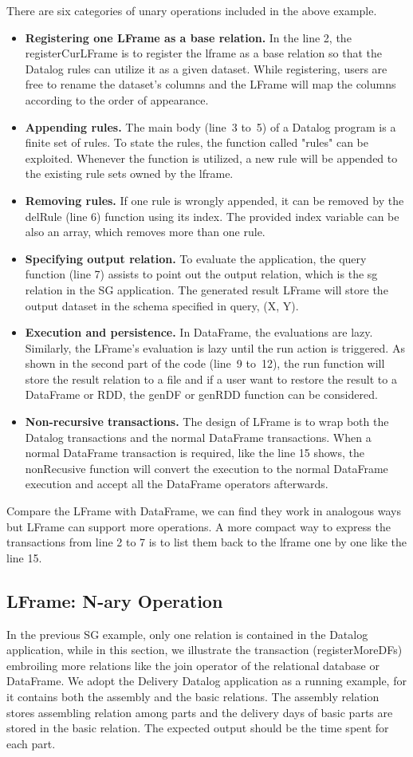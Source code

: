 There are six categories of unary operations included in the above example. 
\begin{itemize}
	\item \textbf{Registering one LFrame as a base relation.} In the line 2, the registerCurLFrame is to register the lframe as a base relation so that the Datalog rules can utilize it as a given dataset. While registering, users are free to rename the dataset's columns and the LFrame will map the columns according to the order of appearance. 
	\item \textbf{Appending rules.} The main body (line~3 to~5) of a Datalog program is a finite set of rules. To state the rules, the function called "rules" can be exploited. Whenever the function is utilized,  a new rule will be appended to the existing rule sets owned by the lframe.
	\item \textbf{Removing rules.} If one rule is wrongly appended, it can be removed by the delRule (line 6) function using its index. The provided index variable can be also an array, which removes more than one rule.
	\item \textbf{Specifying output relation.} To evaluate the application, the query function (line 7)  assists to point out the output relation, which is the sg relation in the SG application. The generated result LFrame will store the output dataset in the schema specified in query, (X, Y).  
	\item \textbf{Execution and persistence.} In DataFrame, the evaluations are lazy. Similarly, the LFrame's evaluation is lazy until the run action is triggered.  As shown in the second part of the code (line~9 to~12), the run function will store the result relation to a file and if a user want to restore the result to a DataFrame or RDD, the genDF or genRDD function can be considered. 
	\item \textbf{Non-recursive transactions.} The design of LFrame is to wrap both the Datalog transactions and the normal DataFrame transactions. When a normal DataFrame transaction is required, like the line 15 shows, the nonRecusive function will convert the execution to the normal DataFrame execution and accept all the DataFrame operators afterwards. 
\end{itemize}
Compare the LFrame with DataFrame, we can find they work in  analogous ways  but LFrame can support more operations. A more compact way to express the transactions from line 2 to 7 is to list them back to the lframe one by one like the line 15. 
\subsection{LFrame: N-ary Operation}
\label{sec:nary}
In the previous SG example, only one relation is contained in the Datalog application, while in this section, we illustrate the transaction (registerMoreDFs)  embroiling more relations like the join operator of the relational database or DataFrame. We adopt the Delivery Datalog application as a running example, for it contains both the assembly and the basic relations. The assembly relation stores assembling relation among parts and the delivery days of basic parts are stored in the basic relation. The expected output should be the  time spent for each part.

